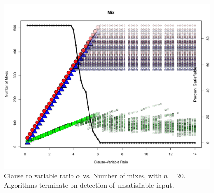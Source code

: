 \begin{figure}[htdp]

\begin{center}

\includegraphics[width=1.1\textwidth]{./figures/metricOutput_n20-earlyExit/mixCount.pdf}

\caption{Clause to variable ratio $\alpha$ vs. Number of mixes, with $n = 20$.  Algorithms terminate on detection of unsatisfiable input. }
\label{mixFig_10}
\end{center}
\end{figure}

\FloatBarrier

